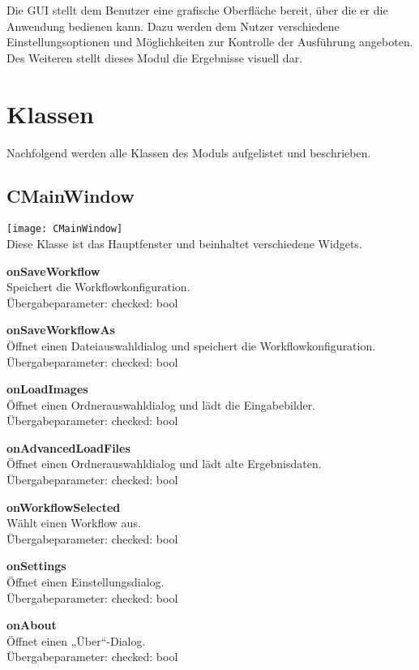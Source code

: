 Die GUI stellt dem Benutzer eine grafische Oberfläche bereit, über die er die Anwendung bedienen kann. Dazu werden dem Nutzer verschiedene Einstellungsoptionen und Möglichkeiten zur Kontrolle der Ausführung angeboten. Des Weiteren stellt dieses Modul die Ergebnisse visuell dar.
\section{Klassen}
\graphicspath{{./img/gui/}}
Nachfolgend werden alle Klassen des Moduls aufgelistet und beschrieben.
\subsection{CMainWindow}
\texttt{[image: CMainWindow]}\\
Diese Klasse ist das Hauptfenster und beinhaltet verschiedene Widgets.
\beginSlots
\item \textbf{onSaveWorkflow} \\Speichert die Workflowkonfiguration. \\Übergabeparameter: checked: bool
\item \textbf{onSaveWorkflowAs} \\Öffnet einen Dateiauswahldialog und speichert die Workflowkonfiguration. \\Übergabeparameter: checked: bool
\item \textbf{onLoadImages} \\Öffnet einen Ordnerauswahldialog und lädt die Eingabebilder. \\Übergabeparameter: checked: bool
\item \textbf{onAdvancedLoadFiles} \\Öffnet einen Ordnerauswahldialog und lädt alte Ergebnisdaten. \\Übergabeparameter: checked: bool
\item \textbf{onWorkflowSelected} \\Wählt einen Workflow aus. \\Übergabeparameter: checked: bool
\item \textbf{onSettings} \\Öffnet einen Einstellungsdialog. \\Übergabeparameter: checked: bool
\item \textbf{onAbout} \\Öffnet einen „Über“-Dialog. \\Übergabeparameter: checked: bool
\closeMembers

